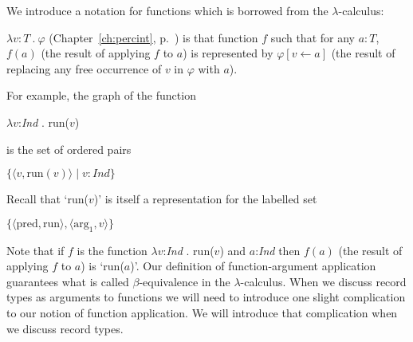







We introduce a notation for functions which is borrowed from the
$\lambda$-calculus:

$\lambda v\!:\!T\ .\ \varphi$ (Chapter~\ref{ch:percint},
p.~\pageref{ex:fun-notation}) is that function $f$ such that for any
$a:T$, $f(a)$ (the result of applying $f$ to $a$) is represented by
$\varphi[v\leftarrow a]$ (the result of replacing any free occurrence
of $v$ in $\varphi$ with $a$).





For
example, the graph of the function

$\lambda v$:\textit{Ind} . run($v$)

is the set of ordered pairs

$\{\langle v,\mathrm{run}(v)\rangle\mid v:\mathit{Ind}\}$

Recall that `run($v$)' is itself a representation for the labelled
set

$\{\langle \mathrm{pred},\mathrm{run}\rangle, \langle
\mathrm{arg}_1,v\rangle\}$

Note that if $f$ is the function $\lambda v$:\textit{Ind} . run($v$)
and $a$:\textit{Ind} then $f(a)$ (the result of applying $f$ to $a$)
is `run($a$)'.  Our definition of function-argument application
guarantees what is called $\beta$-equivalence in the
$\lambda$-calculus.  When we discuss record types as arguments to
functions we will need to introduce one slight complication to our
notion of function application.  We will introduce that complication
when we discuss record types.

